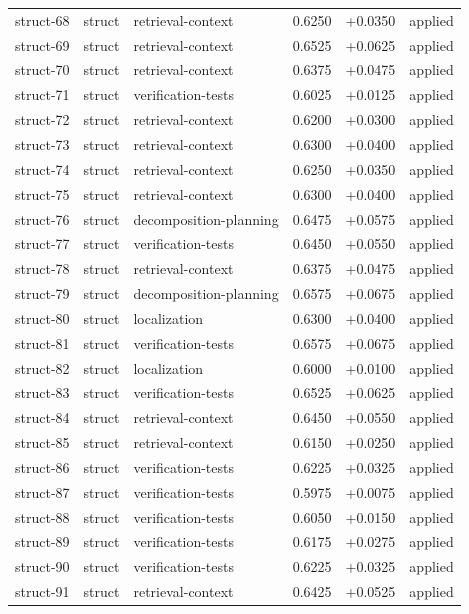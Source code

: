 \begin{center}
\begin{longtable}{llp{5.2cm}rrl}
struct-68 & struct & retrieval-context & 0.6250 & +0.0350 & applied \\
struct-69 & struct & retrieval-context & 0.6525 & +0.0625 & applied \\
struct-70 & struct & retrieval-context & 0.6375 & +0.0475 & applied \\
struct-71 & struct & verification-tests & 0.6025 & +0.0125 & applied \\
struct-72 & struct & retrieval-context & 0.6200 & +0.0300 & applied \\
struct-73 & struct & retrieval-context & 0.6300 & +0.0400 & applied \\
struct-74 & struct & retrieval-context & 0.6250 & +0.0350 & applied \\
struct-75 & struct & retrieval-context & 0.6300 & +0.0400 & applied \\
struct-76 & struct & decomposition-planning & 0.6475 & +0.0575 & applied \\
struct-77 & struct & verification-tests & 0.6450 & +0.0550 & applied \\
struct-78 & struct & retrieval-context & 0.6375 & +0.0475 & applied \\
struct-79 & struct & decomposition-planning & 0.6575 & +0.0675 & applied \\
struct-80 & struct & localization & 0.6300 & +0.0400 & applied \\
struct-81 & struct & verification-tests & 0.6575 & +0.0675 & applied \\
struct-82 & struct & localization & 0.6000 & +0.0100 & applied \\
struct-83 & struct & verification-tests & 0.6525 & +0.0625 & applied \\
struct-84 & struct & retrieval-context & 0.6450 & +0.0550 & applied \\
struct-85 & struct & retrieval-context & 0.6150 & +0.0250 & applied \\
struct-86 & struct & verification-tests & 0.6225 & +0.0325 & applied \\
struct-87 & struct & verification-tests & 0.5975 & +0.0075 & applied \\
struct-88 & struct & verification-tests & 0.6050 & +0.0150 & applied \\
struct-89 & struct & verification-tests & 0.6175 & +0.0275 & applied \\
struct-90 & struct & verification-tests & 0.6225 & +0.0325 & applied \\
struct-91 & struct & retrieval-context & 0.6425 & +0.0525 & applied \\

\end{longtable}
\end{center}
